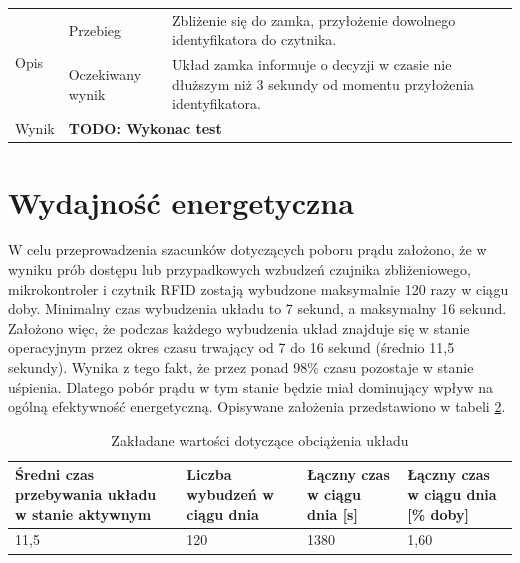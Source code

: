 \begin{table}[h!]
\begin{subtable}[c]{\textwidth}
\begin{tabular}{p{2cm}|p{}|p{}}
                    \multirow{2}{*}{Opis} & Przebieg           & Zbliżenie się do zamka, przyłożenie dowolnego identyfikatora do czytnika.  \\ \cline{2-3}
                                          & Oczekiwany wynik   & Układ zamka informuje o decyzji w czasie nie dłuższym niż 3 sekundy od momentu przyłożenia identyfikatora.                                                  \\ \hline
                    Wynik                 & \multicolumn{2}{p{12cm}}{\textbf{TODO: Wykonac test}} \\
                    \end{tabular}%
                \label{tbl:test6}
                \vspace{10mm}
            \end{subtable}
            \label{tbl:tests}
        \end{table}

    \pagebreak

    \section{Wydajność energetyczna}

        W celu przeprowadzenia szacunków dotyczących poboru prądu założono, że w wyniku prób dostępu lub przypadkowych wzbudzeń czujnika zbliżeniowego, mikrokontroler i czytnik RFID zostają wybudzone maksymalnie 120 razy w ciągu doby. Minimalny czas wybudzenia układu to 7 sekund, a maksymalny 16 sekund. Założono więc, że podczas każdego wybudzenia układ znajduje się w stanie operacyjnym przez okres czasu trwający od 7 do 16 sekund (średnio 11,5 sekundy). Wynika z tego fakt, że przez ponad 98\% czasu pozostaje w stanie uśpienia. Dlatego pobór prądu w tym stanie będzie miał dominujący wpływ na ogólną efektywność energetyczną. Opisywane założenia przedstawiono w tabeli \ref{tbl:tab4}.

        \begin{table}[]
            \caption{Zakładane wartości dotyczące obciążenia układu}
            \centering
            \begin{tabular}{p{4cm}|p{3cm}|p{3cm}|p{3cm}}
                    \textbf{Średni czas przebywania układu w stanie aktywnym} & \textbf{Liczba wybudzeń w ciągu dnia} & \textbf{Łączny czas w ciągu dnia [s]} & \textbf{Łączny czas w ciągu dnia [\% doby]} \\ \hline
                     11,5 & 120 & 1380 & 1,60 \\
            \end{tabular}
            \label{tbl:tab4}
            \vspace{10mm}           
        \end{table}

